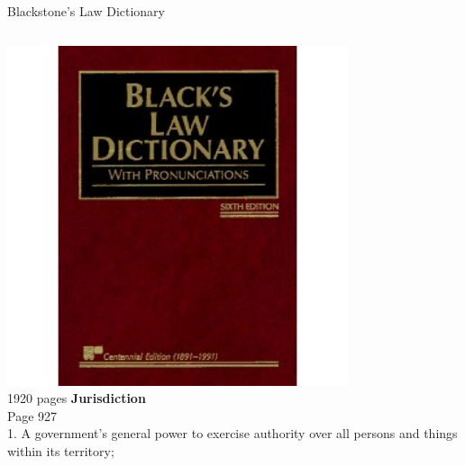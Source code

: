 \begin{frame}{Blackstone's Law Dictionary}
    \begin{columns}[onlytextwidth]
            \centering
            \includegraphics[width=0.75\textwidth]{img/blacks-law.png}
            \\ { \tiny 1920 pages }
        \textbf{Jurisdiction} \\
        Page 927 \\
        1.  A government's general power to exercise authority over all persons and things within its territory;
    \end{columns}
\end{frame}

